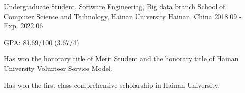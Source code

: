 

\begin{cventries}

  \cventry
    {Undergraduate Student, Software Engineering, Big data branch} %
    {School of Computer Science and Technology, Hainan University} %
    {Hainan, China} %
    {2018.09 - Exp. 2022.06} %
    {
      \begin{cvitems} %
      	\item {GPA: 89.69/100 (3.67/4)}
        \item {Has won the honorary title of Merit Student and the honorary title of Hainan University Volunteer Service Model.}
        \item {Has won the first-class comprehensive scholarship in Hainan University.}
      \end{cvitems}
    }

\end{cventries}
